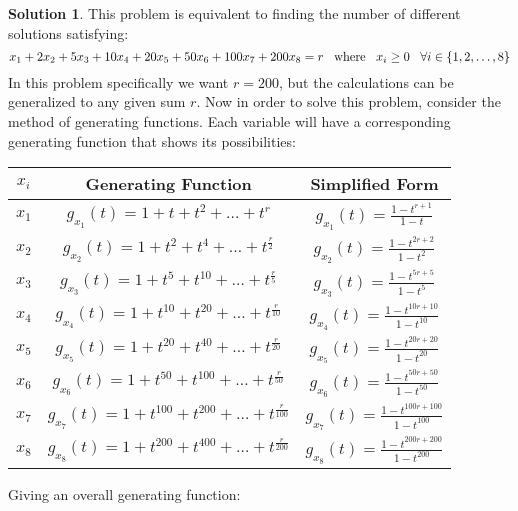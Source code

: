\documentclass[12pt, letterpaper, onecolumn, conference, final]{IEEEtran}
\theoremstyle{definition}
\newtheorem*{solution*}{Solution}
\theoremstyle{plain}
\begin{document}
\vspace{.3cm}
\begin{solution*}
This problem is equivalent to finding the number of different solutions satisfying:
\begin{equation*}
x_1 + 2x_2 + 5x_3 + 10x_4 + 20x_5 + 50x_6 + 100x_7 + 200x_8 = r \hspace{.3cm} \text{where} \hspace{.3cm} x_i \geq 0 \hspace{.3cm} \forall i \in \{1,2,\dots,8\} 
\end{equation*}
In this problem specifically we want $r=200$, but the calculations can be generalized to any given sum $r$. Now in order to solve this problem, consider the method of generating functions. Each variable will have a corresponding generating function that shows its possibilities:
\begin{center}
\def\arraystretch{2}
\begin{tabular}{| c | c | c |}
\hline
$x_i$ & Generating Function & Simplified Form \\ \hline
$x_1$ & $g_{x_1}(t) = 1 + t + t^2 + \dots + t^r$ & $g_{x_1}(t) = \frac{1 - t^{r+1}}{1-t}$ \\ \hline
$x_2$ & $g_{x_2}(t) = 1 + t^2 + t^4 + \dots + t^\frac{r}{2}$ & $g_{x_2}(t) = \frac{1 - t^{2r+2}}{1-t^2}$ \\ \hline
$x_3$ & $g_{x_3}(t) = 1 + t^5 + t^{10} + \dots + t^\frac{r}{5}$ & $g_{x_3}(t) = \frac{1 - t^{5r+5}}{1-t^5}$ \\ \hline
$x_4$ & $g_{x_4}(t) = 1 + t^{10} + t^{20} + \dots + t^\frac{r}{10}$ & $g_{x_4}(t) = \frac{1 - t^{10r+10}}{1-t^{10}}$ \\ \hline
$x_5$ & $g_{x_5}(t) = 1 + t^{20} + t^{40} + \dots + t^\frac{r}{20}$ & $g_{x_5}(t) = \frac{1 - t^{20r+20}}{1-t^{20}}$ \\ \hline
$x_6$ & $g_{x_6}(t) = 1 + t^{50} + t^{100} + \dots + t^\frac{r}{50}$ & $g_{x_6}(t) = \frac{1 - t^{50r+50}}{1-t^{50}}$ \\ \hline
$x_7$ & $g_{x_7}(t) = 1 + t^{100} + t^{200} + \dots + t^\frac{r}{100}$ & $g_{x_7}(t) = \frac{1 - t^{100r+100}}{1-t^{100}}$ \\ \hline
$x_8$ & $g_{x_8}(t) = 1 + t^{200} + t^{400} + \dots + t^\frac{r}{200}$ & $g_{x_8}(t) = \frac{1 - t^{200r+200}}{1-t^{200}}$ \\ \hline
\end{tabular}
\end{center}
Giving an overall generating function:
\begin{equation*}

\end{equation*}
\end{solution*}
\end{document}
